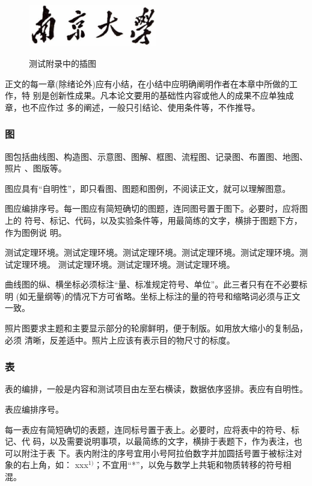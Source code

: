 \documentclass[master]{njuthesis}
\begin{document}
\begin{figure}[htbp]
  \centering
  \includegraphics[width= 0.5\textwidth]{njuname.eps}\\
  \caption{测试附录中的插图}\label{fig:appendix2}
\end{figure}

正文的每一章(除绪论外)应有小结，在小结中应明确阐明作者在本章中所做的工作，特
别是创新性成果。凡本论文要用的基础性内容或他人的成果不应单独成章，也不应作过
多的阐述，一般只引结论、使用条件等，不作推导。

\subsubsection{图}

图包括曲线图、构造图、示意图、图解、框图、流程图、记录图、布置图、地图、照片
、图版等。

图应具有“自明性”，即只看图、图题和图例，不阅读正文，就可以理解图意。

图应编排序号。每一图应有简短确切的图题，连同图号置于图下。必要时，应将图上的
符号、标记、代码，以及实验条件等，用最简练的文字，横排于图题下方，作为图例说
明。

\begin{example}
测试定理环境。测试定理环境。测试定理环境。测试定理环境。测试定理环境。测试定理环境。
测试定理环境。测试定理环境。测试定理环境。
\end{example}

曲线图的纵、横坐标必须标注“量、标准规定符号、单位”。此三者只有在不必要标明
(如无量纲等)的情况下方可省略。坐标上标注的量的符号和缩略词必须与正文一致。

照片图要求主题和主要显示部分的轮廓鲜明，便于制版。如用放大缩小的复制品，必须
清晰，反差适中。照片上应该有表示目的物尺寸的标度。

\subsubsection{表}

表的编排，一般是内容和测试项目由左至右横读，数据依序竖排。表应有自明性。

表应编排序号。

每一表应有简短确切的表题，连同标号置于表上。必要时，应将表中的符号、标记、代
码，以及需要说明事项，以最简练的文字，横排于表题下，作为表注，也可以附注于表
下。表内附注的序号宜用小号阿拉伯数字并加圆括号置于被标注对象的右上角，如：
xxx${}^{1)}$；不宜用“*”，以免与数学上共轭和物质转移的符号相混。
\end{document}
